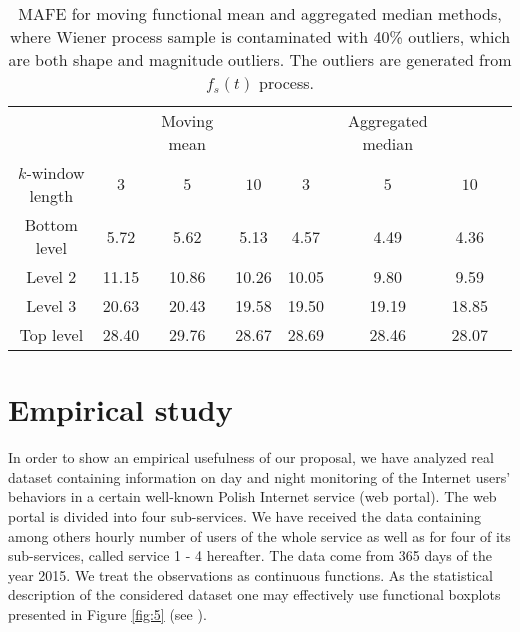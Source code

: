 \documentclass[12pt,a4paper]{article}
\numberwithin{equation}{section}
\begin{document}
\begin{table}
\caption{MAFE for moving functional mean and aggregated median methods, where Wiener process sample is contaminated with 40\% outliers, which are both shape and magnitude outliers. The outliers are generated from $f_s(t)$ process.}
\label{tab:wiener40} 
\begin{center}
\begin{small}
\begin{tabular}{c|ccc|cccc}\hline
\noalign{\smallskip}
 & &Moving mean&  &  &Aggregated median&  \\
	$k$-window length& $3$ & $5$ & $10$ & $3$ &$5$ & $10$ \\\hline
	Bottom level & 5.72 & 5.62
 & 5.13 & 4.57& 4.49
&  4.36

\\
	Level 2 &11.15& 10.86
  & 10.26
& 10.05 &  9.80
&   9.59
\\
	Level 3 &20.63  &20.43& 19.58
& 19.50 & 19.19
 &  18.85
\\
    Top level & 28.40 & 29.76
 &  28.67
& 28.69 & 28.46
&  28.07
\\
\hline	
\end{tabular}
\end{small}
\end{center}
\end{table}

\section{Empirical study}
\label{sec:6}
In order to show an empirical usefulness of our proposal, we have analyzed real dataset containing information on day and night monitoring of the Internet users' behaviors in a certain well-known Polish Internet service (web portal). The web portal is divided into four sub-services. We have received the data containing among others hourly number of users of the whole service as well as for four of its sub-services, called service 1 - 4 hereafter. The data come from 365 days of the year 2015. 
We treat the observations as continuous functions. 
As the statistical description of the considered dataset one may effectively use functional boxplots presented in Figure \ref{fig:5} (see \cite{SunGenton,Kos1}).
\end{document}
